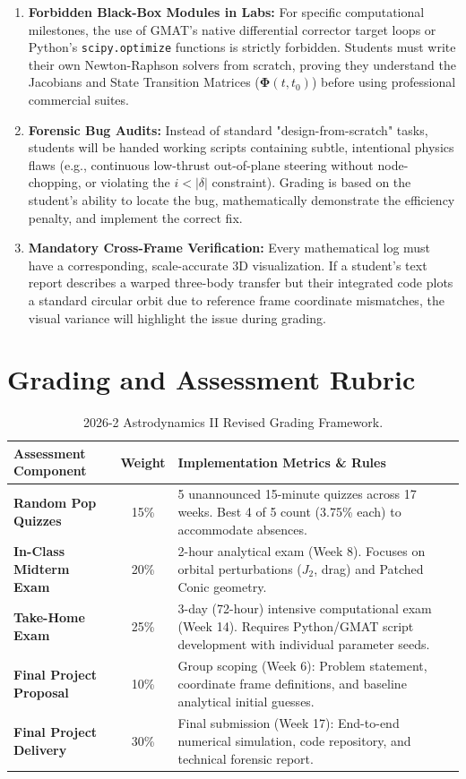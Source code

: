 \documentclass[11pt, letterpaper]{article}
\begin{document}
\begin{enumerate}
    \item \textbf{Forbidden Black-Box Modules in Labs:} For specific computational milestones, the use of GMAT's native differential corrector target loops or Python's \texttt{scipy.optimize} functions is strictly forbidden. Students must write their own Newton-Raphson solvers from scratch, proving they understand the Jacobians and State Transition Matrices ($\boldsymbol{\Phi}(t, t_0)$) before using professional commercial suites.
    \item \textbf{Forensic Bug Audits:} Instead of standard "design-from-scratch" tasks, students will be handed working scripts containing subtle, intentional physics flaws (e.g., continuous low-thrust out-of-plane steering without node-chopping, or violating the $i < |\delta|$ constraint). Grading is based on the student's ability to locate the bug, mathematically demonstrate the efficiency penalty, and implement the correct fix.
    \item \textbf{Mandatory Cross-Frame Verification:} Every mathematical log must have a corresponding, scale-accurate 3D visualization. If a student's text report describes a warped three-body transfer but their integrated code plots a standard circular orbit due to reference frame coordinate mismatches, the visual variance will highlight the issue during grading.
\end{enumerate}

\section{Grading and Assessment Rubric}

\begin{table}[h]
\centering
\small
\begin{tabular}{lc p{9.5cm}}
\toprule
\textbf{Assessment Component} & \textbf{Weight} & \textbf{Implementation Metrics \& Rules} \\ \midrule
\textbf{Random Pop Quizzes}   & 15\% & 5 unannounced 15-minute quizzes across 17 weeks. Best 4 of 5 count (3.75\% each) to accommodate absences. \\ \addlinespace
\textbf{In-Class Midterm Exam}& 20\% & 2-hour analytical exam (Week 8). Focuses on orbital perturbations ($J_2$, drag) and Patched Conic geometry. \\ \addlinespace
\textbf{Take-Home Exam}       & 25\% & 3-day (72-hour) intensive computational exam (Week 14). Requires Python/GMAT script development with individual parameter seeds. \\ \addlinespace
\textbf{Final Project Proposal}& 10\% & Group scoping (Week 6): Problem statement, coordinate frame definitions, and baseline analytical initial guesses. \\ \addlinespace
\textbf{Final Project Delivery}& 30\% & Final submission (Week 17): End-to-end numerical simulation, code repository, and technical forensic report. \\ \bottomrule
\end{tabular}
\caption{2026-2 Astrodynamics II Revised Grading Framework.}
\end{table}
\end{document}
